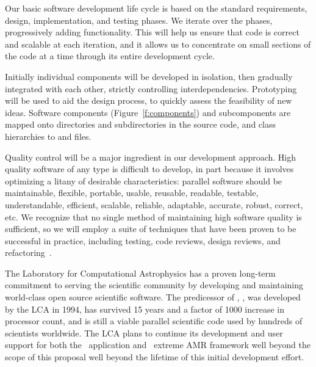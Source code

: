 \documentclass[11pt,letterpaper]{article}
\begin{document}
Our basic software development life cycle is based on the standard
requirements, design, implementation, and testing phases.  We iterate
over the phases, progressively adding functionality.  This will help
us ensure that code is correct and scalable at each iteration, and it
allows us to concentrate on small sections of the code at a time
through its entire development cycle.  

Initially individual components will be developed in isolation, then
gradually integrated with each other, strictly controlling
interdependencies.  Prototyping will be used to aid the design
process, to quickly assess the feasibility of new ideas.  Software
components (Figure~\ref{f:components}) and subcomponents are mapped
onto directories and subdirectories in the source code, and class
hierarchies to  and  files.


Quality control will be a major ingredient in our development
approach.  High quality software of any type is difficult to develop,
in part because it involves optimizing a litany of desirable
characteristics: parallel software should be maintainable, flexible,
portable, usable, reusable, readable, testable, understandable,
efficient, scalable, reliable, adaptable, accurate, robust, correct,
etc.  We recognize that no single method of maintaining high software
quality is sufficient, so we will employ a suite of techniques that
have been proven to be successful in practice, including testing, code
reviews, design reviews, and refactoring~\cite{Mc04}.

 The Laboratory for Computational
Astrophysics has a proven long-term commitment to serving the
scientific community by developing and maintaining world-class open
source scientific software.
%
The predicessor of \enzoii, \enzo, was developed by the LCA in 1994,
has survived 15 years and a factor of 1000 increase in processor
count, and is still a viable parallel scientific code used by hundreds
of scientists worldwide.
%
The LCA plans to continue its development and user support for both
the \enzoii\ application and \cello\ extreme AMR framework well beyond
the scope of this proposal well beyond the lifetime of this initial
development effort.
\end{document}
